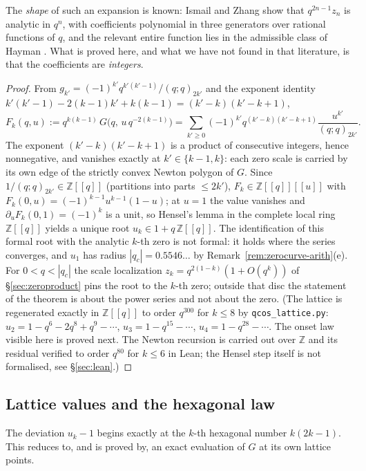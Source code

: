 \documentclass[11pt]{article}
\theoremstyle{plain}
\theoremstyle{definition}
\theoremstyle{remark}
\newcommand{\Z}{\mathbb{Z}}
\begin{document}
\noindent The \emph{shape} of such an expansion is known: Ismail and Zhang \cite{IsmailZhang2007}
show that $q^{2n-1}z_n$ is analytic in $q^n$, with coefficients polynomial in three generators over
rational functions of $q$, and the relevant entire function lies in the admissible class of
Hayman \cite{Hayman1956}.
What is proved here, and what we have not found in that literature, is that the coefficients are
\emph{integers}.

\begin{proof}
From $g_{k'}=(-1)^{k'}q^{k'(k'-1)}/(q;q)_{2k'}$ and the exponent identity
$k'(k'-1)-2(k-1)k'+k(k-1)=(k'-k)(k'-k+1)$,
\[
   F_k(q,u):=q^{k(k-1)}\,G\bigl(q,\,u\,q^{-2(k-1)}\bigr)
   =\sum_{k'\ge0}(-1)^{k'}q^{(k'-k)(k'-k+1)}\frac{u^{k'}}{(q;q)_{2k'}} .
\]
The exponent $(k'-k)(k'-k+1)$ is a product of consecutive integers, hence nonnegative, and vanishes
exactly at $k'\in\{k-1,k\}$: each zero scale is carried by its own edge of the strictly convex
Newton polygon of $G$. Since $1/(q;q)_{2k'}\in\Z[[q]]$ (partitions into parts $\le2k'$),
$F_k\in\Z[[q]][[u]]$ with $F_k(0,u)=(-1)^{k-1}u^{k-1}(1-u)$; at $u=1$ the value vanishes and
$\partial_uF_k(0,1)=(-1)^k$ is a unit, so Hensel's lemma in the complete local ring $\Z[[q]]$
yields a unique root $u_k\in1+q\,\Z[[q]]$. The identification of this formal root with the
analytic $k$-th zero is not formal: it holds where the series converges, and $u_1$ has radius
$|q_c|=0.5546\ldots$ by Remark~\ref{rem:zerocurve-arith}(e). For $0<q<|q_c|$ the scale
localization $z_k=q^{2(1-k)}(1+O(q^k))$ of \S\ref{sec:zeroproduct} pins the root to the $k$-th
zero; outside that disc the statement of the theorem is about the power series and not about the
zero. (The lattice is regenerated exactly in $\Z[[q]]$ to order $q^{300}$ for $k\le8$ by
\texttt{qcos\_lattice.py}: $u_2=1-q^6-2q^8+q^9-\cdots$, $u_3=1-q^{15}-\cdots$,
$u_4=1-q^{28}-\cdots$. The onset law visible here is proved next. The Newton recursion is carried
out over $\Z$ and its residual verified to order $q^{80}$ for $k\le6$ in Lean; the Hensel step
itself is not formalised, see \S\ref{sec:lean}.)
\end{proof}

\subsection{Lattice values and the hexagonal law}
The deviation $u_k-1$ begins exactly at the $k$-th hexagonal number $k(2k-1)$. This reduces to, and
is proved by, an exact evaluation of $G$ at its own lattice points.
\end{document}
